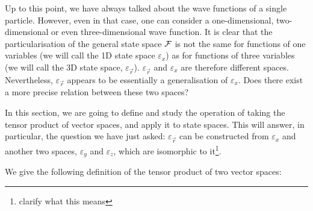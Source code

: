 Up to this point, we have always talked about the wave functions of a single particle. However, even in that case, one can consider a one-dimensional, two-dimensional or even three-dimensional wave function. It is clear that the particularisation of the general state space $\mathcal{F}$ is not the same for functions of one variables (we will call the 1D state space $\varepsilon_x$) as for functions of three variables (we will call the 3D state space, $\varepsilon_{\vec{r}}$). $\varepsilon_{\vec{r}}$ and $\varepsilon_x$ are therefore different spaces. Nevertheless, $\varepsilon_{\vec{r}}$ appears to be essentially a generalisation of $\varepsilon_x$. Does there exist a more precise relation between these two spaces?

In this section, we are going to define and study the operation of taking the tensor product of vector spaces, and apply it to state spaces. This will answer, in particular, the question we have just asked: $\varepsilon_{\vec{r}}$ can be constructed from $\varepsilon_x$ and another two spaces, $\varepsilon_y$ and $\varepsilon_z$, which are isomorphic to it\footnote{\color{red}clarify what this means}. 

We give the following definition of the tensor product of two vector spaces:

